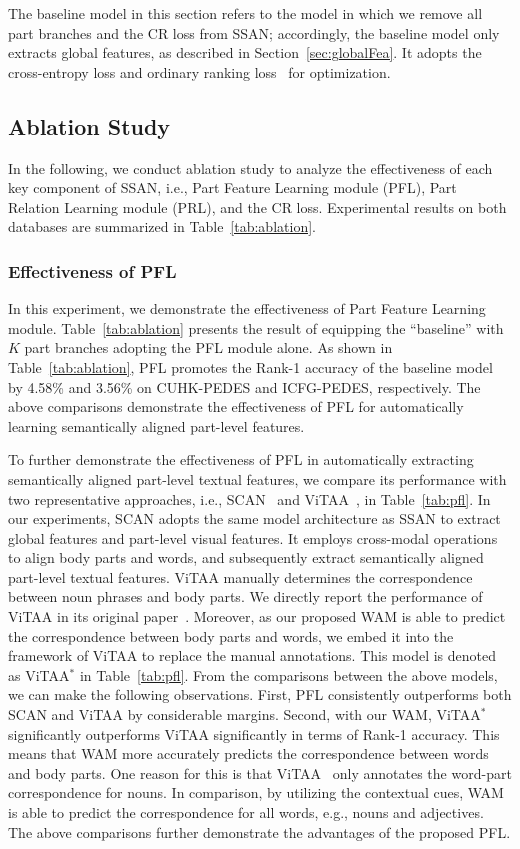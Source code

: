 \documentclass[journal]{IEEEtran}
\begin{document}
The baseline model in this section refers to the model in which we remove all part branches and the CR loss from SSAN; accordingly, the baseline model only extracts global features, as described in Section~\ref{sec:globalFea}. It adopts the cross-entropy loss and ordinary ranking loss~\cite{faghri2017vse++} for optimization.

\subsection{Ablation Study}
\label{sec:ablation}
In the following, we conduct ablation study to analyze the effectiveness of each key component of SSAN, i.e., Part Feature Learning module (PFL), Part Relation Learning module (PRL), and the CR loss. Experimental results on both databases are summarized in Table~\ref{tab:ablation}.


\subsubsection{Effectiveness of PFL}\label{ablation_pfl} In this experiment, we demonstrate the effectiveness of Part Feature Learning module.
Table~\ref{tab:ablation} presents the result of equipping the ``baseline''  with $K$ part branches adopting the PFL module alone.
As shown in Table~\ref{tab:ablation}, PFL promotes the Rank-1 accuracy of the baseline model by 4.58\% and 3.56\% on CUHK-PEDES and ICFG-PEDES, respectively.
The above comparisons demonstrate the effectiveness of PFL for automatically learning semantically aligned part-level features.

To further demonstrate the effectiveness of PFL in automatically extracting semantically aligned part-level textual features,
we compare its performance with two representative approaches, i.e., SCAN~\cite{lee2018stacked} and ViTAA~\cite{wang2020vitaa}, in Table~\ref{tab:pfl}.
In our experiments, SCAN adopts the same model architecture as SSAN to extract global features and part-level visual features.
It employs cross-modal operations to align body parts and words,
and subsequently extract semantically aligned part-level textual features.
ViTAA manually determines the correspondence between noun phrases and body parts.
We directly report the performance of ViTAA in its original paper~\cite{wang2020vitaa}.
Moreover, as our proposed WAM is able to predict the correspondence between body parts and words, we embed it into the framework of ViTAA to replace the manual annotations.
This model is denoted as ViTAA$^{*}$ in Table~\ref{tab:pfl}. From the comparisons between the above models, we can make the following observations.
First, PFL consistently outperforms both SCAN and ViTAA by considerable margins.
Second, with our WAM, ViTAA$^{*}$ significantly outperforms ViTAA significantly in terms of Rank-1 accuracy.
This means that WAM  more accurately predicts the correspondence between words and body parts.
One reason for this is that ViTAA~\cite{wang2020vitaa} only annotates the word-part correspondence for nouns.
In comparison, by utilizing the contextual cues, WAM is able to predict the correspondence for all words, e.g., nouns and adjectives.
The above comparisons further demonstrate the advantages of the proposed PFL.
\end{document}
